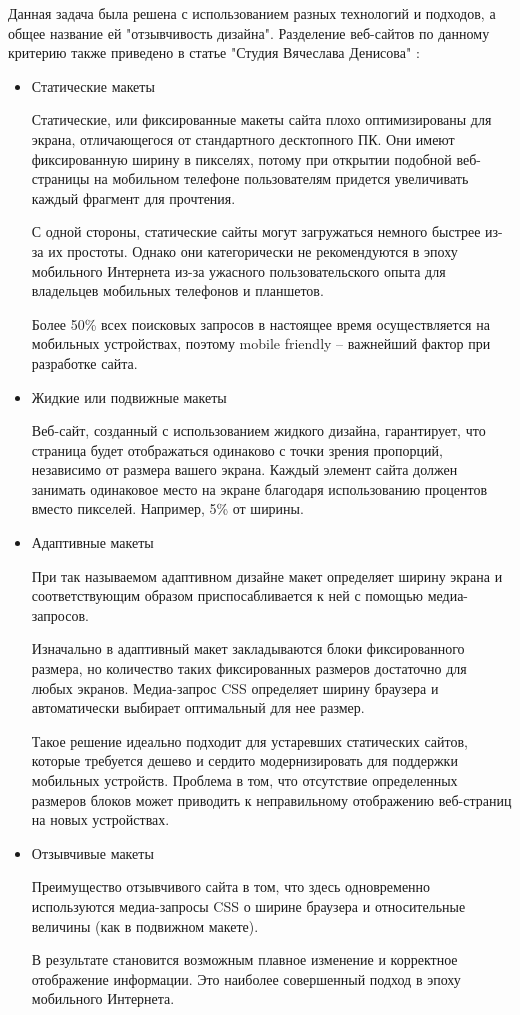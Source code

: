 Данная задача была решена с использованием разных технологий и подходов, а общее название ей "отзывчивость дизайна".
Разделение веб-сайтов по данному критерию также приведено в статье "Студия Вячеслава Денисова" \cite{denisov}:
\begin{itemize}
    \item Статические макеты

    Статические, или фиксированные макеты сайта плохо оптимизированы для экрана, отличающегося от стандартного десктопного ПК. Они имеют фиксированную ширину в пикселях, потому при открытии подобной веб-страницы на мобильном телефоне пользователям придется увеличивать каждый фрагмент для прочтения.
    
    С одной стороны, статические сайты могут загружаться немного быстрее из-за их простоты. Однако они категорически не рекомендуются в эпоху мобильного Интернета из-за ужасного пользовательского опыта для владельцев мобильных телефонов и планшетов.
    
    Более 50\% всех поисковых запросов в настоящее время осуществляется на мобильных устройствах, поэтому mobile friendly – важнейший фактор при разработке сайта.
    
    \item Жидкие или подвижные макеты
    
    Веб-сайт, созданный с использованием жидкого дизайна, гарантирует, что страница будет отображаться одинаково с точки зрения пропорций, независимо от размера вашего экрана. Каждый элемент сайта должен занимать одинаковое место на экране благодаря использованию процентов вместо пикселей. Например, 5\% от ширины.
    
    \item Адаптивные макеты
    
    При так называемом адаптивном дизайне макет определяет ширину экрана и соответствующим образом приспосабливается к ней с помощью медиа-запросов.
    
    Изначально в адаптивный макет закладываются блоки фиксированного размера, но количество таких фиксированных размеров достаточно для любых экранов. Медиа-запрос CSS определяет ширину браузера и автоматически выбирает оптимальный для нее размер.
    
    Такое решение идеально подходит для устаревших статических сайтов, которые требуется дешево и сердито модернизировать для поддержки мобильных устройств. Проблема в том, что отсутствие определенных размеров блоков может приводить к неправильному отображению веб-страниц на новых устройствах.
    
    \item Отзывчивые макеты
    
    Преимущество отзывчивого сайта в том, что здесь одновременно используются медиа-запросы CSS о ширине браузера и относительные величины (как в подвижном макете).
    
    В результате становится возможным плавное изменение и корректное отображение информации. Это наиболее совершенный подход в эпоху мобильного Интернета.
\end{itemize}

